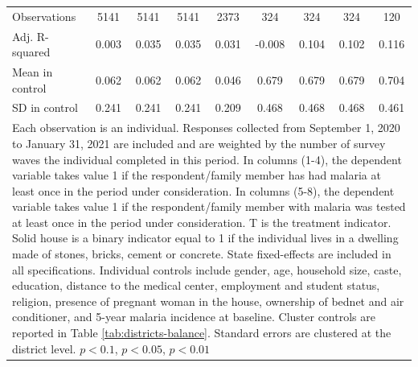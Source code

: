 {{\begin{tabular}{l*{8}{c}}
\hline
Observations    &\num{5141}         &\num{5141}         &\num{5141}         &\num{2373}         &\num{324}         &\num{324}         &\num{324}         &\num{120}         \\
Adj. R-squared  &    0.003         &    0.035         &    0.035         &    0.031         &   -0.008         &    0.104         &    0.102         &    0.116         \\
Mean in control &    0.062         &    0.062         &    0.062         &    0.046         &    0.679         &    0.679         &    0.679         &    0.704         \\
SD in control   &    0.241         &    0.241         &    0.241         &    0.209         &    0.468         &    0.468         &    0.468         &    0.461         \\
\hline\hline
\multicolumn{9}{p{1.02\linewidth}}{\scriptsize Each observation is an individual. Responses collected from September 1, 2020 to January 31, 2021 are included and are weighted by the number of survey waves the individual completed in this period. In columns (1-4), the dependent variable takes value 1 if the respondent/family member has had malaria at least once in the period under consideration. In columns (5-8), the dependent variable takes value 1 if the respondent/family member with malaria was tested at least once in the period under consideration. T is the treatment indicator. Solid house is a binary indicator equal to 1 if the individual lives in a dwelling made of stones, bricks, cement or concrete. State fixed-effects are included in all specifications. Individual controls include gender, age, household size, caste, education, distance to the medical center, employment and student status, religion, presence of pregnant woman in the house, ownership of bednet and air conditioner, and 5-year malaria incidence at baseline. Cluster controls are reported in Table \ref{tab:districts-balance}. Standard errors are clustered at the district level.  \sym{*} \(p<0.1\), \sym{**} \(p<0.05\), \sym{***} \(p<0.01\)}\\
\end{tabular}
}%

}
